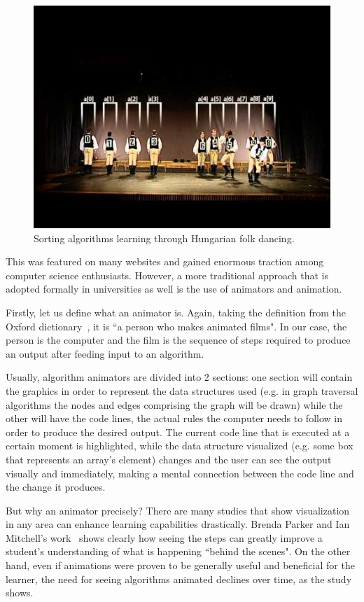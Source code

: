 \documentclass{l4proj}
\begin{document}
\begin{figure}[!ht]
\centering
\includegraphics[scale=0.6]{quicksort}
\caption{Sorting algorithms learning through Hungarian folk dancing.}
\label{fig:quicksort}
\end{figure}

This was featured on many websites and gained enormous traction among computer science enthusiasts. However, a more
traditional approach that is adopted formally in universities as well is the use of animators and animation.

Firstly, let us define what an animator is. Again, taking the definition from the Oxford dictionary~\cite{oxford-dict},
it is ``a person who makes animated films". In our case, the person is the computer and the film is the sequence of steps required to produce an output after feeding input to an algorithm.

Usually, algorithm animators are divided into 2 sections: one section will contain the graphics in order to represent the
data structures used (e.g. in graph traversal algorithms the nodes and edges comprising the graph will be drawn) while
the other will have the code lines, the actual rules the computer needs to follow in order to produce the desired
output. The current code line that is executed at a certain moment is highlighted, while the data structure visualized (e.g. some box that represents an array's element) changes and the user can see the output visually and immediately, making a mental connection between the code line and the change it produces.

But why an animator precisely? There are many studies that show visualization in any area can enhance learning
capabilities drastically. Brenda Parker and Ian Mitchell's work~\cite{parker-mitchell} shows clearly how seeing the
steps can greatly improve a student's understanding of what is happening ``behind the scenes". On the other hand, even if animations were proven to be generally useful and beneficial for the learner, the need for seeing algorithms animated declines over time, as the study shows.
\end{document}
